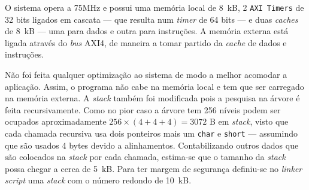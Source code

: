 O sistema opera a 75MHz e possui uma memória local de 8~kB, 2 \texttt{AXI~Timers} de 32 bits ligados em cascata --- que resulta num \textit{timer} de 64 bits --- e duas \textit{caches} de 8~kB --- uma para dados e outra para instruções. A memória externa está ligada através do \textit{bus} AXI4, de maneira a tomar partido da \textit{cache} de dados e instruções.

Não foi feita qualquer optimização ao sistema de modo a melhor acomodar a aplicação. Assim, o programa não cabe na memória local e tem que ser carregado na memória externa. A \textit{stack} também foi modificada pois a pesquisa na árvore é feita recursivamente. Como no pior caso a árvore tem 256 níveis podem ser ocupados aproximadamente $256 \times (4 + 4 + 4) = 3072$ B em \textit{stack}, visto que cada chamada recursiva usa dois ponteiros mais um \texttt{char} e \texttt{short} --- assumindo que são usados 4 bytes devido a alinhamentos. Contabilizando outros dados que são colocados na \textit{stack} por cada chamada, estima-se que o tamanho da \textit{stack} possa chegar a cerca de 5~kB. Para ter margem de segurança definiu-se no \textit{linker script} uma \textit{stack} com o número redondo de 10~kB.
